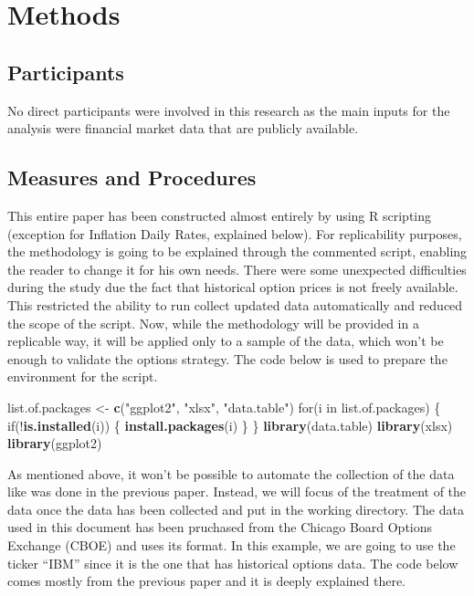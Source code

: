 \documentclass[english,man]{apa6}
\newenvironment{Shaded}{\begin{snugshade}}{\end{snugshade}}
\newcommand{\KeywordTok}[1]{\textcolor[rgb]{0.13,0.29,0.53}{\textbf{{#1}}}}
\newcommand{\StringTok}[1]{\textcolor[rgb]{0.31,0.60,0.02}{{#1}}}
\newcommand{\NormalTok}[1]{{#1}}
\begin{document}
\section{Methods}\label{methods}

\subsection{Participants}\label{participants}

No direct participants were involved in this research as the main inputs
for the analysis were financial market data that are publicly available.

\subsection{Measures and Procedures}\label{measures-and-procedures}

This entire paper has been constructed almost entirely by using R
scripting (exception for Inflation Daily Rates, explained below). For
replicability purposes, the methodology is going to be explained through
the commented script, enabling the reader to change it for his own
needs. There were some unexpected difficulties during the study due the
fact that historical option prices is not freely available. This
restricted the ability to run collect updated data automatically and
reduced the scope of the script. Now, while the methodology will be
provided in a replicable way, it will be applied only to a sample of the
data, which won't be enough to validate the options strategy. The code
below is used to prepare the environment for the script.

\begin{Shaded}
\begin{Highlighting}[]
\NormalTok{list.of.packages <-}\StringTok{ }\KeywordTok{c}\NormalTok{(}\StringTok{"ggplot2"}\NormalTok{, }\StringTok{"xlsx"}\NormalTok{, }\StringTok{"data.table"}\NormalTok{)}
\NormalTok{for(i in list.of.packages) \{}
  \NormalTok{if(!}\KeywordTok{is.installed}\NormalTok{(i)) \{}
  \KeywordTok{install.packages}\NormalTok{(i)}
  \NormalTok{\}}
\NormalTok{\}}
\KeywordTok{library}\NormalTok{(data.table)}
\KeywordTok{library}\NormalTok{(xlsx)}
\KeywordTok{library}\NormalTok{(ggplot2)}
\end{Highlighting}
\end{Shaded}

As mentioned above, it won't be possible to automate the collection of
the data like was done in the previous paper. Instead, we will focus of
the treatment of the data once the data has been collected and put in
the working directory. The data used in this document has been pruchased
from the Chicago Board Options Exchange (CBOE) and uses its format. In
this example, we are going to use the ticker \enquote{IBM} since it is
the one that has historical options data. The code below comes mostly
from the previous paper and it is deeply explained there.
\end{document}
